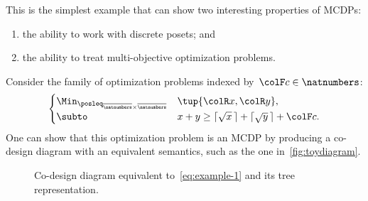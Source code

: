 This is the simplest example that can show two interesting properties
of MCDPs:
\begin{enumerate}
    \item the ability to work with discrete posets; and
    \item the ability to treat multi-objective optimization problems.
\end{enumerate}
Consider the family of optimization problems indexed by~${\colF c}\in\natnumbers$:
\begin{equation}
    \begin{cases}
        \Min_{\posleq_{\overline{\natnumbers}\times\overline{\natnumbers}}} & \tup{ {\colR x},{\colR y}} ,\\
        \subto & x+y\geq\lceil\sqrt{x}\,\rceil+\lceil\sqrt{y}\,\rceil+{\colF c}.
    \end{cases}\label{eq:example-1}
\end{equation}
One can show that this optimization problem is an MCDP by producing
a co-design diagram with an equivalent semantics, such as the one
in~\cref{fig:toydiagram}.

\begin{figure}[h]

    \caption{Co-design diagram equivalent to~\cref{eq:example-1} and its tree representation.}
\end{figure}

